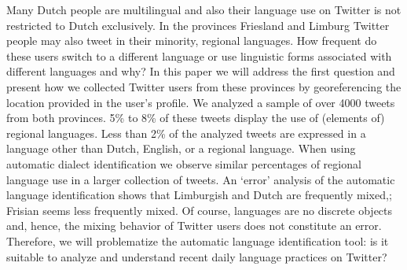 \documentclass[10pt, a4paper, twopage, headinclude, footinclude, BCOR5mm]{book}
\begin{document}
\begin{table}[t!]
\end{table} 
\noindent
Many Dutch people are multilingual and also their language use on Twitter is not restricted to Dutch exclusively. In the provinces Friesland and Limburg Twitter people may also tweet in their minority, regional languages. How frequent do these users switch to a different language or use linguistic forms associated with different languages and why? In this paper we will address the first question and present how we collected Twitter users from these provinces by georeferencing the location provided in the user's profile. We analyzed a sample of over 4000 tweets from both provinces. 5\% to 8\% of these tweets display the use of (elements of) regional languages. Less than 2\% of the analyzed tweets are expressed in a language other than Dutch, English, or a regional language. When using automatic dialect identification we observe similar percentages of regional language use in a larger collection of tweets. An `error' analysis of the automatic language identification shows that Limburgish and Dutch are frequently mixed,; Frisian seems less frequently mixed. Of course, languages are no discrete objects and, hence, the mixing behavior of Twitter users does not constitute an error. Therefore, we will problematize the automatic language identification tool: is it suitable to analyze and understand recent daily language practices on Twitter?  
\end{document}
